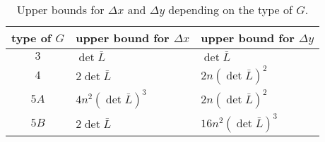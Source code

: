 \documentclass{article}
\theoremstyle{plain} \newtheorem{thm}{Theorem}[section]
\begin{document}
\renewcommand{\arraystretch}{1.2}
\begin{table}
   \centering
   \begin{tabular}{cll}\hline \hline
       type of $G$ & upper bound for $\Delta x$ & upper bound for $\Delta y$  \\
     \hline \hline
     $3$ &  $\det\bar L$ & $\det \bar L$ \\
     $4$ &  $2\det\bar L$ & $2n(\det\bar L)^2$ \\ 
    $5A$ & $4n^2 (\det\bar L)^3$ & $2n (\det\bar L)^2$\\
    $5B$ & $2 \det\bar L$ & $16 n^2(\det{\bar{L}})^3$ \\
 \hline
   \end{tabular}
   \caption{Upper bounds for  $\Delta{x}$ and $\Delta y$ depending on the type of $G$.}
 \label{tab:upperbounds}
 \end{table}
 
 
\end{document}
